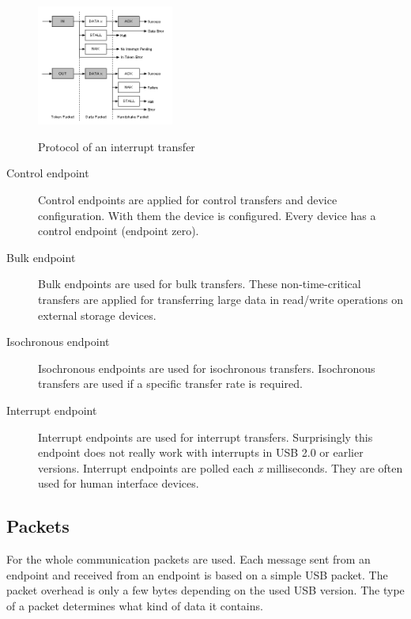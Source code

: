 \documentclass{acm_proc_article-sp}
\begin{document}
\begin{figure}
\centering
\includegraphics[width=0.4\textwidth]{interrupttransfer.png}
\label{fig:interrupttransfer}
\caption{Protocol of an interrupt transfer \cite{beyond}}
\end{figure}

\begin{description}
\item[Control endpoint]
Control endpoints are applied for control transfers and device configuration.
With them the device is configured.
Every device has a control endpoint (endpoint zero).

\item[Bulk endpoint]
Bulk endpoints are used for bulk transfers.
These non-time-critical transfers are applied for transferring large data
in read/write operations on external storage devices.

\item[Isochronous endpoint]
Isochronous endpoints are used for isochronous transfers.
Isochronous transfers are used if a specific transfer rate is required.

\item[Interrupt endpoint]
Interrupt endpoints are used for interrupt transfers.
Surprisingly this endpoint does not really work with interrupts in USB 2.0 or earlier versions.
Interrupt endpoints are polled each \emph{x} milliseconds.
They are often used for human interface devices.

\end{description}

\subsection{Packets}
For the whole communication packets are used.
Each message sent from an endpoint and received from an endpoint is based on a simple USB packet.
The packet overhead is only a few bytes depending on the used USB version.
The type of a packet determines what kind of data it contains.
\end{document}
